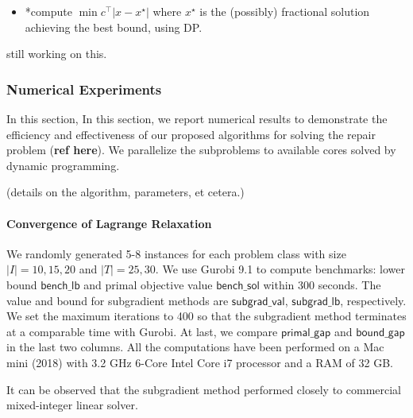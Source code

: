 \documentclass[
  a4paper,
,tablecaptionabove
]{scrartcl}
\numberwithin{equation}{section}
\providecommand{\tightlist}{%
  \setlength{\itemsep}{0pt}\setlength{\parskip}{0pt}}
\begin{document}
\begin{itemize}
  \tightlist
  \item
        *compute \(\min c ^\top | x - x^\star|\) where \(x^\star\) is the
        (possibly) fractional solution achieving the best bound, using DP.
\end{itemize}

still working on this.

\hypertarget{numerical-experiments}{%
  \subsubsection{Numerical Experiments}\label{numerical-experiments}}

In this section, In this section, we report numerical results to
demonstrate the efficiency and effectiveness of our proposed algorithms
for solving the repair problem (\textbf{ref here}). We parallelize the
subproblems to available cores solved by dynamic programming.

(details on the algorithm, parameters, et cetera.)

\hypertarget{convergence-of-lagrange-relaxation}{%
  \paragraph{Convergence of Lagrange
    Relaxation}\label{convergence-of-lagrange-relaxation}}

We randomly generated 5-8 instances for each problem class with size
\(|I| = 10, 15, 20\) and \(|T| = 25, 30\). We use Gurobi 9.1 to compute
benchmarks: lower bound \(\mathsf{bench\_lb}\) and primal objective
value \(\mathsf{bench\_sol}\) within 300 seconds. The value and bound
for subgradient methods are \(\mathsf{subgrad\_val}\),
\(\mathsf{subgrad\_lb}\), respectively. We set the maximum iterations to
400 so that the subgradient method terminates at a comparable time with
Gurobi. At last, we compare \(\mathsf{primal\_gap}\) and
\(\mathsf{bound\_gap}\) in the last two columns. All the computations
have been performed on a Mac mini (2018) with 3.2 GHz 6-Core Intel Core
i7 processor and a RAM of 32 GB.

It can be observed that the subgradient method performed closely to
commercial mixed-integer linear solver.
\end{document}
